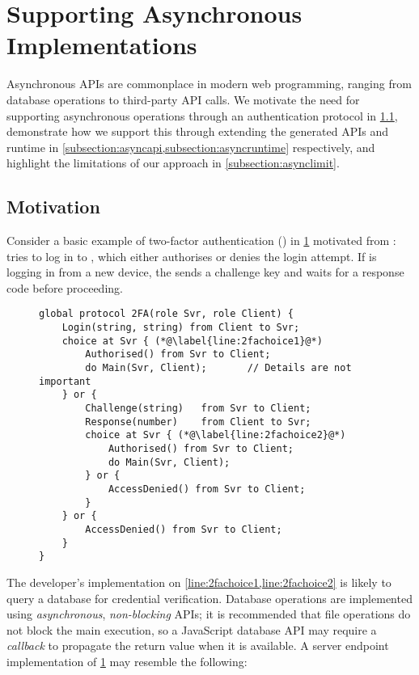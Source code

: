 \section{Supporting Asynchronous Implementations}
\label{section:async}

Asynchronous APIs are commonplace in modern web programming,
ranging from database operations to third-party API calls.
We motivate the need for supporting asynchronous operations
through an authentication protocol in
\cref{subsection:asyncmotivation},
demonstrate how we support this through extending
the generated APIs and runtime in
\cref{subsection:asyncapi,subsection:asyncruntime}
respectively, 
and highlight the limitations of our approach in
\cref{subsection:asynclimit}.

\subsection{Motivation}
\label{subsection:asyncmotivation}

Consider a basic example of two-factor authentication 
() in \cref{lst:2FA} motivated from \cite{Exceptional}:
 tries to log in to , which either
authorises or denies the login attempt. If  is logging 
in from a new device, the  sends a challenge key
and waits for a response code before proceeding.

\begin{figure}[!h]
\begin{lstlisting}[language=scribble]
global protocol 2FA(role Svr, role Client) {
	Login(string, string) from Client to Svr;
	choice at Svr { (*@\label{line:2fachoice1}@*)
		Authorised() from Svr to Client;
		do Main(Svr, Client);		// Details are not important
	} or {
		Challenge(string)	from Svr to Client;
		Response(number) 	from Client to Svr;
		choice at Svr { (*@\label{line:2fachoice2}@*)
			Authorised() from Svr to Client;
			do Main(Svr, Client);
		} or {
			AccessDenied() from Svr to Client;
		}
	} or {
		AccessDenied() from Svr to Client;	
	}
}
\end{lstlisting}
\label{lst:2FA}
\end{figure}

The developer's implementation on 
\cref{line:2fachoice1,line:2fachoice2} is likely to query
a database for credential verification.
Database operations are implemented using \textit{asynchronous},
\textit{non-blocking} APIs; it is
recommended that file operations do not block the main execution,
so a JavaScript database API may require a \textit{callback}
to propagate the return value when it is available.
A server endpoint implementation of \cref{lst:2FA}
may resemble the following:


